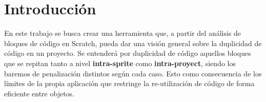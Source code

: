 \documentclass[a4paper, 12pt]{book}
\begin{document}


\tableofcontents 
\cleardoublepage
\listoffigures %



\cleardoublepage
\chapter{Introducción}
\label{sec:intro} %



En este trabajo se busca crear una herramienta que, a partir del análisis de bloques de código en Scratch, pueda dar una visión general sobre la duplicidad de código en un proyecto. Se entenderá por duplicidad de código aquellos bloques que se repitan tanto a nivel \textbf{intra-sprite} como \textbf{intra-proyect}, siendo los baremos de penalización distintos según cada caso. Esto como consecuencia de los límites de la propia aplicación que restringe la re-utilización de código de forma eficiente entre objetos.
\end{document}
